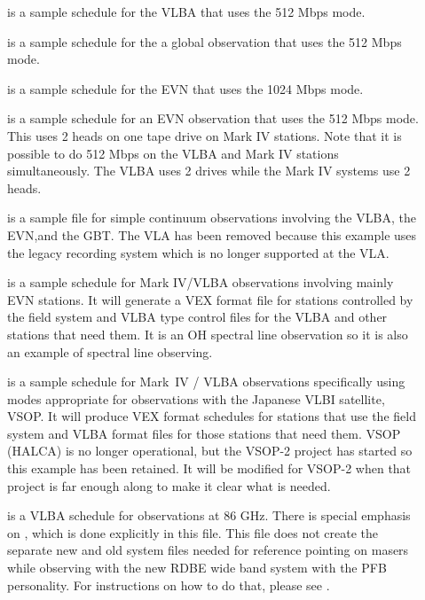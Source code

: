 \documentclass{report}
\begin{document}
\begin{description}
\item[] is a
sample schedule for the VLBA that uses the 512 Mbps mode.

\item[] is a
sample schedule for the a global observation that uses the 512 Mbps mode.

\item[] is a
sample schedule for the EVN that uses the 1024 Mbps mode.

\item[] is a
sample schedule for an EVN observation that uses the 512 Mbps mode.
This uses 2 heads on one tape drive on Mark IV stations.  Note that
it is possible to do 512 Mbps on the VLBA and Mark IV stations
simultaneously.  The VLBA uses 2 drives while the Mark IV systems
use 2 heads.

\item[]
is a sample file for simple continuum observations involving the VLBA,
the EVN,and the GBT.  The VLA has been removed because this example
uses the legacy recording system which is no longer supported at the
VLA.

\item[] is a
sample schedule for Mark IV/VLBA observations involving mainly EVN
stations.  It will generate a VEX format file for stations controlled
by the field system and VLBA type control files for the VLBA and other
stations that need them.  It is an OH spectral line observation so it
is also an example of spectral line observing.

\item[] is a
sample schedule for Mark~IV / VLBA observations specifically using
modes appropriate for observations with the Japanese VLBI satellite,
VSOP.  It will produce VEX format schedules for stations that use the
field system and VLBA format files for those stations that need them.
VSOP (HALCA) is no longer operational, but the VSOP-2 project has started
so this example has been retained.  It will be modified for VSOP-2
when that project is far enough along to make it clear what is needed.

\item[] is a
VLBA schedule for observations at 86 GHz.  There is special emphasis
on , which is done
explicitly in this file.
This file does not create the separate new and old system files needed
for reference pointing on masers while observing with the new RDBE wide
band system with the PFB personality.  For instructions on how to do 
that, please see 
.


\end{description}
\end{document}
